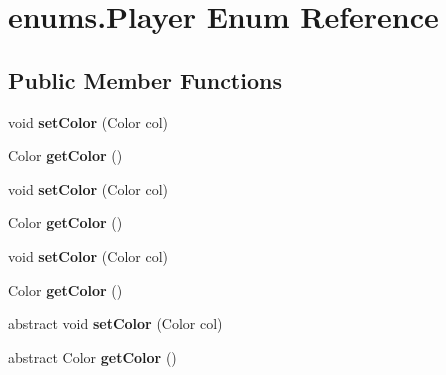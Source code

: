 \hypertarget{enumenums_1_1_player}{\section{enums.\-Player Enum Reference}
\label{enumenums_1_1_player}
}
\subsection*{Public Member Functions}
\begin{DoxyCompactItemize}
\item 
\hypertarget{enumenums_1_1_player_a8438bcd58644696af01994ab07b6f77b}{void {\bfseries set\-Color} (Color col)}\label{enumenums_1_1_player_a8438bcd58644696af01994ab07b6f77b}

\item 
\hypertarget{enumenums_1_1_player_a4c52bf75063d6b1645f62d11c6f261c0}{Color {\bfseries get\-Color} ()}\label{enumenums_1_1_player_a4c52bf75063d6b1645f62d11c6f261c0}

\item 
\hypertarget{enumenums_1_1_player_a8438bcd58644696af01994ab07b6f77b}{void {\bfseries set\-Color} (Color col)}\label{enumenums_1_1_player_a8438bcd58644696af01994ab07b6f77b}

\item 
\hypertarget{enumenums_1_1_player_a4c52bf75063d6b1645f62d11c6f261c0}{Color {\bfseries get\-Color} ()}\label{enumenums_1_1_player_a4c52bf75063d6b1645f62d11c6f261c0}

\item 
\hypertarget{enumenums_1_1_player_a8438bcd58644696af01994ab07b6f77b}{void {\bfseries set\-Color} (Color col)}\label{enumenums_1_1_player_a8438bcd58644696af01994ab07b6f77b}

\item 
\hypertarget{enumenums_1_1_player_a4c52bf75063d6b1645f62d11c6f261c0}{Color {\bfseries get\-Color} ()}\label{enumenums_1_1_player_a4c52bf75063d6b1645f62d11c6f261c0}

\item 
\hypertarget{enumenums_1_1_player_a3f9222c80845dc7b73bd5615e52ac346}{abstract void {\bfseries set\-Color} (Color col)}\label{enumenums_1_1_player_a3f9222c80845dc7b73bd5615e52ac346}

\item 
\hypertarget{enumenums_1_1_player_a67ab297a723e780cdf97d6799a7cc69a}{abstract Color {\bfseries get\-Color} ()}\label{enumenums_1_1_player_a67ab297a723e780cdf97d6799a7cc69a}

\end{DoxyCompactItemize}
